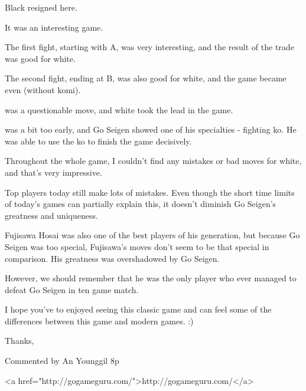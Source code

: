 \documentclass[letterpaper,12pt]{memoir}
\begin{document}
\begin{minipage}[t]{268.19999999999993pt}
\setlength{\parskip}{0.5em}
Black resigned here. 

It was an interesting game.

The first fight, starting with A, was very interesting, and the result of the trade was good for white.

The second fight, ending at B, was also good for white, and the game became even (without komi).

{} was a questionable move, and white took the lead in the game.

{} was a bit too early, and Go Seigen showed one of his specialties - fighting ko. He was able to use the ko to finish the game decisively.

Throughout the whole game, I couldn't find any mistakes or bad moves for white, and that's very impressive.

Top players today still make lots of mistakes. Even though the short time limits of today's games can partially explain this, it doesn't diminish Go Seigen's greatness and uniqueness.

Fujisawa Hosai was also one of the best players of his generation, but because Go Seigen was too special, Fujisawa's moves don't seem to be that special in comparison. His greatness was overshadowed by Go Seigen.

However, we should remember that he was the only player who ever managed to defeat Go Seigen in ten game match.

I hope you've to enjoyed seeing this classic game and can feel some of the differences between this game and modern games. :)

Thanks, 

Commented by An Younggil 8p

<a href="http://gogameguru.com/">http://gogameguru.com/</a>


\end{minipage}
\vfill
\end{document}
